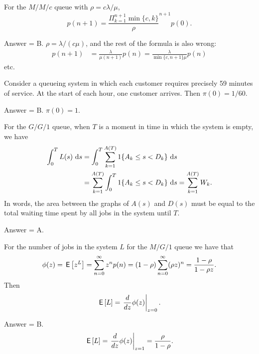 \begin{exercise}[201704]%
For the $M/M/c$ queue with $\rho= c \lambda/\mu$, 
    \begin{equation*}
       p(n+1) = \frac{\Pi_{k=1}^{n+1}\min\{c, k\}}\rho^{n+1} p(0).
    \end{equation*}
\begin{solution} Answer = B. $\rho= \lambda/ (c\mu)$, and the rest of the formula is also wrong:
    \begin{align*}
        p(n+1) 
&= \frac{\lambda}{\mu(n+1)}p(n) 
= \frac{\lambda}{\min\{c, n+1\} \mu }p(n)
    \end{align*}
etc.
\end{solution}
\end{exercise}

\begin{exercise}[201704]%
  Consider a queueing system in which each customer requires precisely
  59 minutes of service. At the start of each hour, one customer arrives. Then
  $\pi(0) = 1/60$.
\begin{solution} Answer = B. $\pi(0)=1$.
\end{solution}
\end{exercise}

\begin{exercise}[201704]%
For  the $G/G/1$ queue, when $T$ is a moment in time in which the system is empty, we have
\begin{equation*}
  \begin{split}
  \int_0^T L(s)\, \,\text{d}s & = \int_0^T \sum_{k=1}^{A(T)} 1\{A_k \leq s < D_k\} \, \,\text{d}s \\
& =  \sum_{k=1}^{A(T)}\int_0^T  1\{A_k \leq s < D_k\} \, \,\text{d}s =  \sum_{k=1}^{A(T)} W_k.
  \end{split}
\end{equation*}
In words, the area between the graphs of $A(s)$ and $D(s)$ must
be equal to the total waiting time spent by all jobs in the system
until $T$. 
\begin{solution} Answer = A.
\end{solution}
\end{exercise}

\begin{exercise}[201704]%
  For the number of jobs in the system $L$ for the $M/G/1$ queue we have that
\begin{equation*}
  \phi(z) = \,\mathsf{E}\left[z^L\right] = \sum_{n=0}^\infty z^n p(n) = (1-\rho) \sum_{n=0}^\infty (\rho z)^n = \frac{1-\rho}{1-\rho z}.
\end{equation*}
Then 
\begin{equation*}
  \,\mathsf{E}\left[L\right] = \left.\frac d {dz} \phi(z)\right|_{z=0}.
\end{equation*}

\begin{solution} Answer = B.
\begin{equation*}
  \,\mathsf{E}\left[L\right] = \left.\frac d {dz} \phi(z)\right|_{z=1} = \frac{\rho}{1-\rho}.
\end{equation*}
\end{solution}
\end{exercise}



